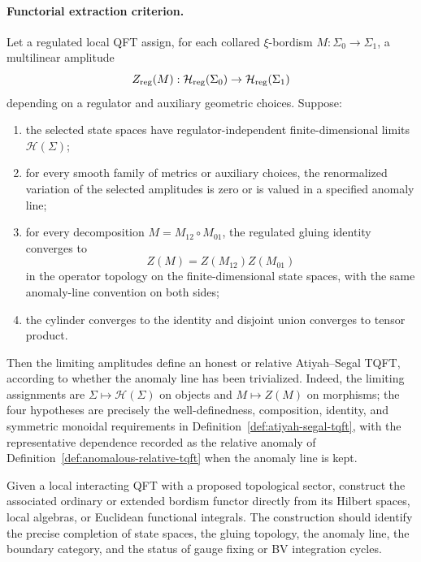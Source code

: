 \paragraph{Functorial extraction criterion.}
Let a regulated local QFT assign, for each collared \(\xi\)-bordism
\(M:\Sigma_0\to\Sigma_1\), a multilinear amplitude
\[
  Z_{\rm reg}(M):\mathcal H_{\rm reg}(\Sigma_0)\to
  \mathcal H_{\rm reg}(\Sigma_1)
\]
depending on a regulator and auxiliary geometric choices.  Suppose:
\begin{enumerate}[label=(\roman*)]
\item the selected state spaces have regulator-independent finite-dimensional
  limits \(\mathcal H(\Sigma)\);
\item for every smooth family of metrics or auxiliary choices, the
  renormalized variation of the selected amplitudes is zero or is valued in a
  specified anomaly line;
\item for every decomposition \(M=M_{12}\circ M_{01}\), the regulated gluing
  identity converges to
  \[
    Z(M)=Z(M_{12})Z(M_{01})
  \]
  in the operator topology on the finite-dimensional state spaces, with the
  same anomaly-line convention on both sides;
\item the cylinder converges to the identity and disjoint union converges to
  tensor product.
\end{enumerate}
Then the limiting amplitudes define an honest or relative Atiyah--Segal TQFT,
according to whether the anomaly line has been trivialized.  Indeed, the
limiting assignments are \(\Sigma\mapsto\mathcal H(\Sigma)\) on objects and
\(M\mapsto Z(M)\) on morphisms; the four hypotheses are precisely the
well-definedness, composition, identity, and symmetric monoidal requirements
in Definition~\ref{def:atiyah-segal-tqft}, with the representative dependence
recorded as the relative anomaly of
Definition~\ref{def:anomalous-relative-tqft} when the anomaly line is kept.

\begin{openproblem}
\label{op:functorial-extraction-from-qft}
Given a local interacting QFT with a proposed topological sector, construct
the associated ordinary or extended bordism functor directly from its Hilbert
spaces, local algebras, or Euclidean functional integrals.  The construction
should identify the precise completion of state spaces, the gluing topology,
the anomaly line, the boundary category, and the status of gauge fixing or BV
integration cycles.
\end{openproblem}

